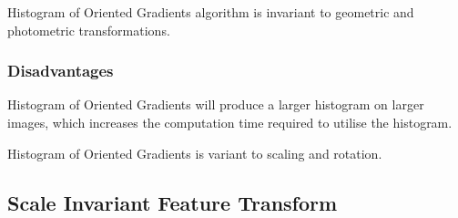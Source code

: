 \documentclass[conference]{IEEEtran}
\begin{document}
Histogram of Oriented Gradients algorithm is invariant to geometric and
photometric transformations\cite{hog-2}\cite{hog-3}.


\subsubsection{Disadvantages}
Histogram of Oriented Gradients will produce a larger histogram on larger
images, which increases the computation time required to utilise the histogram.

Histogram of Oriented Gradients is variant to scaling and rotation.


\subsection{Scale Invariant Feature Transform}
\end{document}
